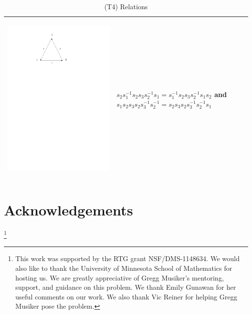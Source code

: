 \documentclass[11pt]{amsart}
\theoremstyle{definition}
\begin{document}
\begin{table}
\begin{tabular}{| p{3.5cm} | p{7cm} |}
\begin{center}\includegraphics[scale = .30]{Diagram5.pdf}\end{center} & $s_{2}s_{1}^{-1}s_{2}s_{3}s_{2}^{-1}s_{1} = s_{1}^{-1}s_{2}s_{3}s_{2}^{-1}s_{1}s_{2}$ and $s_{1}s_{2}s_{3}s_{2}s_{3}^{-1}s_{2}^{-1} = s_{2}s_{3}s_{2}s_{3}^{-1}s_{2}^{-1}s_{1}$ \\ \hline
\end{tabular}
\caption{(T4) Relations}
\end{table}


\section{Acknowledgements}
\thanks{This work was supported by the RTG grant NSF/DMS-1148634. We would also like to thank the University of Minnesota School of Mathematics for hosting us. We are greatly appreciative of Gregg Musiker's mentoring, support, and guidance on this problem. We thank Emily Gunawan for her useful comments on our work. We also thank Vic Reiner for helping Gregg Musiker pose the problem.}



\end{document}
